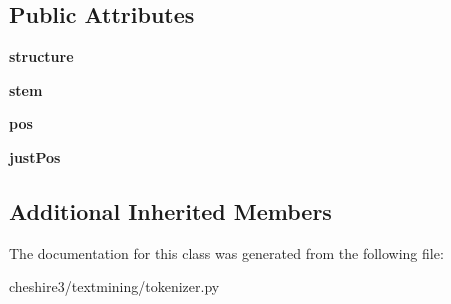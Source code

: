 \subsection*{Public Attributes}
\begin{DoxyCompactItemize}
\item 
\hypertarget{classcheshire3_1_1textmining_1_1tokenizer_1_1_unparsed_genia_tokenizer_a450a1e8c42d2e748c32cbce91584f8b8}{{\bfseries structure}}\label{classcheshire3_1_1textmining_1_1tokenizer_1_1_unparsed_genia_tokenizer_a450a1e8c42d2e748c32cbce91584f8b8}

\item 
\hypertarget{classcheshire3_1_1textmining_1_1tokenizer_1_1_unparsed_genia_tokenizer_a7e6dfe2f4abd652765f79cdd6a698390}{{\bfseries stem}}\label{classcheshire3_1_1textmining_1_1tokenizer_1_1_unparsed_genia_tokenizer_a7e6dfe2f4abd652765f79cdd6a698390}

\item 
\hypertarget{classcheshire3_1_1textmining_1_1tokenizer_1_1_unparsed_genia_tokenizer_a8b6a94f4836cfb177f5e05f38f29fdc4}{{\bfseries pos}}\label{classcheshire3_1_1textmining_1_1tokenizer_1_1_unparsed_genia_tokenizer_a8b6a94f4836cfb177f5e05f38f29fdc4}

\item 
\hypertarget{classcheshire3_1_1textmining_1_1tokenizer_1_1_unparsed_genia_tokenizer_a09228540b1cca18f72b96b375c453fd1}{{\bfseries just\-Pos}}\label{classcheshire3_1_1textmining_1_1tokenizer_1_1_unparsed_genia_tokenizer_a09228540b1cca18f72b96b375c453fd1}

\end{DoxyCompactItemize}
\subsection*{Additional Inherited Members}


The documentation for this class was generated from the following file\-:\begin{DoxyCompactItemize}
\item 
cheshire3/textmining/tokenizer.\-py\end{DoxyCompactItemize}
